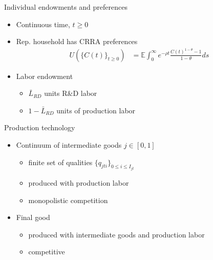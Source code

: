 \documentclass[english,usenames,dvipsnames]{beamer}
\begin{document}
\begin{frame}{Individual endowments and preferences}
	\begin{itemize}
		\item Continuous time, $t \ge 0$
		\item Rep. household has CRRA preferences 
		\begin{align*}
		U(\{C(t)\}_{t \ge 0}) &= \mathbb{E} \int_0^{\infty} e^{-\rho t} \frac{C(t)^{1-\theta} - 1}{1 - \theta} ds
		\end{align*}
		\item Labor endowment
		\begin{itemize}
			\item $\bar{L}_{RD}$ units R\&D labor
			\item $1 - \bar{L}_{RD}$ units of production labor
		\end{itemize}
	\end{itemize}
\end{frame}

\begin{frame}{Production technology}
	\begin{itemize}
		\item Continuum of intermediate goods $j \in [0,1]$ 
		\begin{itemize}
			\item finite set of qualities $\{q_{jti}\}_{0 \le i \le I_{jt}}$
			\item produced with production labor 
			\item monopolistic competition
		\end{itemize}
		\smallskip
		\item Final good
		\begin{itemize}
			\item produced with intermediate goods and production labor
			\item competitive
		\end{itemize}
	\end{itemize}
\end{frame}
\end{document}
